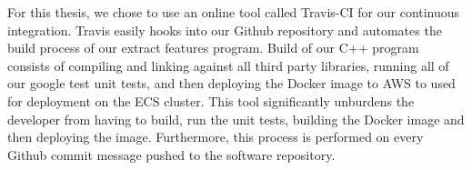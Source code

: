 For this thesis, we chose to use an online tool called Travis-CI for our continuous
integration. Travis easily hooks into our Github repository and automates the build
process of our extract features program. Build of our C++ program consists of
compiling and linking against all third party libraries, running all of our
google test unit tests, and then deploying the Docker image to AWS to used
for deployment on the ECS cluster. This tool significantly unburdens the developer
from having to build, run the unit tests, building the Docker image and then deploying
the image. Furthermore, this process is performed on every Github commit message
pushed to the software repository. 

